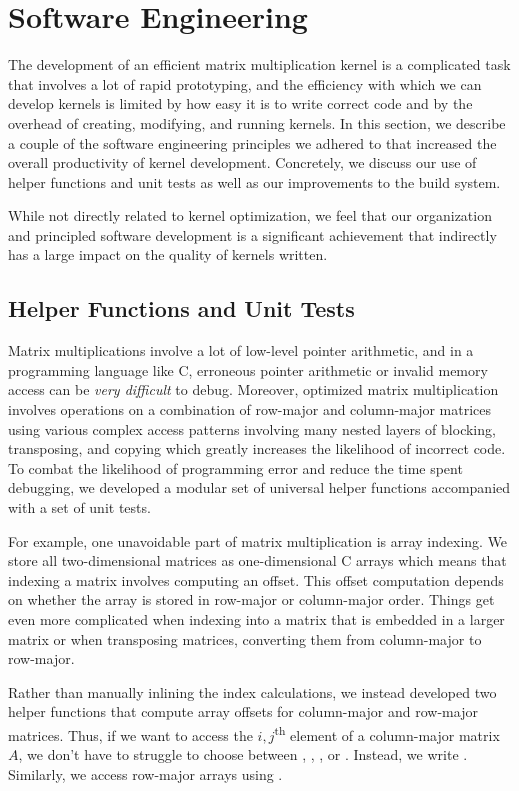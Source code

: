 \section{Software Engineering}\label{sec:sweng}
The development of an efficient matrix multiplication kernel is a complicated
task that involves a lot of rapid prototyping, and the efficiency with which we
can develop kernels is limited by how easy it is to write correct code and by
the overhead of creating, modifying, and running kernels. In this section, we
describe a couple of the software engineering principles we adhered to that
increased the overall productivity of kernel development. Concretely, we
discuss our use of helper functions and unit tests as well as our improvements
to the build system.

While not directly related to kernel optimization, we feel that our
organization and principled software development is a significant achievement
that indirectly has a large impact on the quality of kernels written.

\subsection{Helper Functions and Unit Tests}
Matrix multiplications involve a lot of low-level pointer arithmetic, and in a
programming language like C, erroneous pointer arithmetic or invalid memory
access can be \emph{very difficult} to debug. Moreover, optimized matrix multiplication
involves operations on a combination of row-major and column-major matrices
using various complex access patterns involving many nested layers of blocking,
transposing, and copying which greatly increases the likelihood of incorrect
code. To combat the likelihood of programming error and reduce the time spent
debugging, we developed a modular set of universal helper functions accompanied
with a set of unit tests.

For example, one unavoidable part of matrix multiplication is array indexing.
We store all two-dimensional matrices as one-dimensional C arrays which means
that indexing a matrix involves computing an offset. This offset computation
depends on whether the array is stored in row-major  or column-major order.
Things get even more complicated when indexing into a matrix that is embedded
in a larger matrix or when transposing matrices, converting them from
column-major to row-major.

Rather than manually inlining the index calculations, we instead developed two
helper functions that compute array offsets for column-major and row-major
matrices. Thus, if we want to access the $i,j$\textsuperscript{th} element of a
column-major matrix $A$, we don't have to struggle to choose between , , , or . Instead, we
write . Similarly, we access row-major arrays using
.

